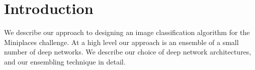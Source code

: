 \section{Introduction}

We describe our approach to designing an image classification algorithm for the Miniplaces challenge. At a high level our approach is an ensemble of a small number of deep networks. We describe our choice of deep network architectures, and our ensembling technique in detail. 